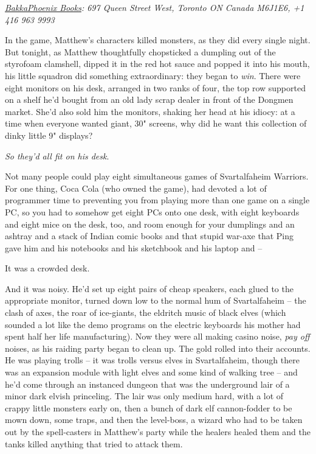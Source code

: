 \emph{\href{http://www.bakkaphoenixbooks.com/}{BakkaPhoenix Books}: 697 Queen Street West, Toronto ON Canada M6J1E6, +1 416 963 9993}

In the game, Matthew's characters killed monsters, as they did
every single night. But tonight, as Matthew thoughtfully
chopsticked a dumpling out of the styrofoam clamshell, dipped it in
the red hot sauce and popped it into his mouth, his little squadron
did something extraordinary: they began to \emph{win}.
There were eight monitors on his desk, arranged in two ranks of
four, the top row supported on a shelf he'd bought from an old lady
scrap dealer in front of the Dongmen market. She'd also sold him
the monitors, shaking her head at his idiocy: at a time when
everyone wanted giant, 30" screens, why did he want this collection
of dinky little 9" displays?

\emph{So they'd all fit on his desk}.

Not many people could play eight simultaneous games of
Svartalfaheim Warriors. For one thing, Coca Cola (who owned the
game), had devoted a lot of programmer time to preventing you from
playing more than one game on a single PC, so you had to somehow
get eight PCs onto one desk, with eight keyboards and eight mice on
the desk, too, and room enough for your dumplings and an ashtray
and a stack of Indian comic books and that stupid war-axe that Ping
gave him and his notebooks and his sketchbook and his laptop and
--

It was a crowded desk.

And it was noisy. He'd set up eight pairs of cheap speakers, each
glued to the appropriate monitor, turned down low to the normal hum
of Svartalfaheim -- the clash of axes, the roar of ice-giants, the
eldritch music of black elves (which sounded a lot like the demo
programs on the electric keyboards his mother had spent half her
life manufacturing). Now they were all making casino noise,
\emph{pay off} noises, as his raiding party began to clean up. The
gold rolled into their accounts. He was playing trolls -- it was
trolls versus elves in Svartalfaheim, though there was an expansion
module with light elves and some kind of walking tree -- and he'd
come through an instanced dungeon that was the underground lair of
a minor dark elvish princeling. The lair was only medium hard, with
a lot of crappy little monsters early on, then a bunch of dark elf
cannon-fodder to be mown down, some traps, and then the level-boss,
a wizard who had to be taken out by the spell-casters in Matthew's
party while the healers healed them and the tanks killed anything
that tried to attack them.

